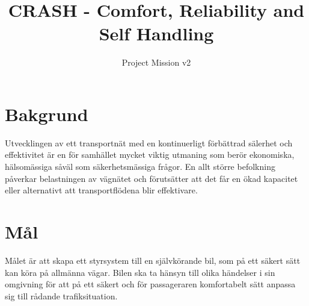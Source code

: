 \documentclass[10pt]{article}
\title{CRASH - Comfort, Reliability and Self Handling}
\author{Project Mission v2}
\date{}
\begin{document}

\begin{titlepage}
\clearpage
  \maketitle
\thispagestyle{empty}

\end{titlepage}


\tableofcontents
\thispagestyle{empty}
\newpage
{}
\section{Bakgrund}
\sloppy
\noindent Utvecklingen av ett transportnät med en kontinuerligt förbättrad sälerhet och effektivitet är en för samhället mycket viktig utmaning som berör ekonomiska, hälsomässiga såväl som säkerhetsmässiga frågor. En allt större befolkning påverkar belastningen av vägnätet och förutsätter att det får en ökad kapacitet eller alternativt att transportflödena blir effektivare.

\section{Mål}
\sloppy
\noindent Målet är att skapa ett styrsystem till en självkörande bil, som på ett säkert sätt kan köra på allmänna vägar. Bilen ska ta hänsyn till olika händelser i sin omgivning för att på ett säkert och för passageraren komfortabelt sätt anpassa sig till rådande trafiksituation. 

\end{document}
